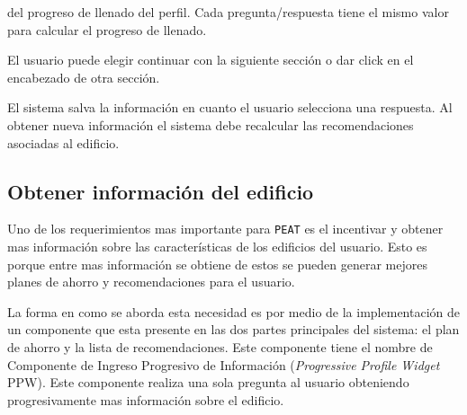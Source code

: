 \begin{usecase}
{\begin{enumerate}
      del progreso de llenado del perfil. Cada pregunta/respuesta tiene el
      mismo valor para calcular el progreso de llenado.
    \end{enumerate}
  \item El usuario puede elegir continuar con la siguiente sección o dar click
    en el encabezado de otra sección.
  \item El sistema salva la información en cuanto el usuario selecciona
    una respuesta. Al obtener nueva información el sistema debe recalcular
    las recomendaciones asociadas al edificio.
  }
\end{usecase}

\subsection{Obtener información del edificio}

Uno de los requerimientos mas importante para \texttt{PEAT} es el incentivar y
obtener mas información sobre las características de los edificios del usuario.
Esto es porque entre mas información se obtiene de estos se pueden generar
mejores planes de ahorro y recomendaciones para el usuario.

La forma en como se aborda esta necesidad es por medio de la implementación
de un componente que esta presente en las dos partes principales del sistema:
el plan de ahorro y la lista de recomendaciones. Este componente tiene el
nombre de Componente de Ingreso Progresivo de Información (\textit{Progressive
  Profile Widget} PPW). Este componente realiza una sola pregunta al usuario
obteniendo progresivamente mas información sobre el edificio.

